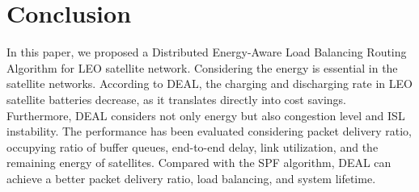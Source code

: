 \section{Conclusion}

In this paper, we proposed a Distributed Energy-Aware Load Balancing Routing Algorithm for LEO satellite network. Considering the energy is essential in the satellite networks. According to DEAL, the charging and discharging rate in LEO satellite batteries decrease, as it translates directly into cost savings. Furthermore, DEAL considers not only energy but also congestion level and ISL instability. The performance has been evaluated considering packet delivery ratio, occupying ratio of buffer queues, end-to-end delay, link utilization, and the remaining energy of satellites. Compared with the SPF algorithm, DEAL can achieve a better packet delivery ratio, load balancing, and system lifetime.
